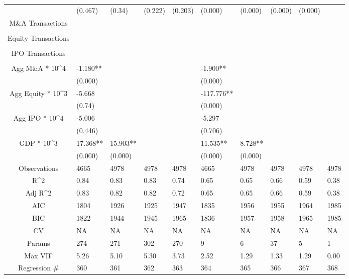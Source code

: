 \documentclass{article}
\begin{document}
\begin{table}[H]
\begin{tabular}{|clllllllll|}
   & (0.467) & (0.34) & (0.222) & (0.203) & (0.000) & (0.000) & (0.000) & (0.000) &  \\ 
  M\&A Transactions &  &  &  &  &  &  &  &  &  \\ 
   &  &  &  &  &  &  &  &  &  \\ 
  Equity Transactions &  &  &  &  &  &  &  &  &  \\ 
   &  &  &  &  &  &  &  &  &  \\ 
  IPO Transactions &  &  &  &  &  &  &  &  &  \\ 
   &  &  &  &  &  &  &  &  &  \\ 
  Agg M\&A * 10^4 & -1.180** &  &  &  & -1.900** &  &  &  &  \\ 
   & (0.000) &  &  &  & (0.000) &  &  &  &  \\ 
  Agg Equity * 10^3 & -5.668 &  &  &  & -117.776** &  &  &  &  \\ 
   & (0.74) &  &  &  & (0.000) &  &  &  &  \\ 
  Agg IPO * 10^4 & -5.006 &  &  &  & -5.297 &  &  &  &  \\ 
   & (0.446) &  &  &  & (0.706) &  &  &  &  \\ 
  GDP * 10^3 & 17.368** & 15.903** &  &  & 11.535** & 8.728** &  &  &  \\ 
   & (0.000) & (0.000) &  &  & (0.000) & (0.000) &  &  &  \\ 
  \hline 
 Observations & 4665 & 4978 & 4978 & 4978 & 4665 & 4978 & 4978 & 4978 & 4978 \\ 
  R^2 & 0.84 & 0.83 & 0.83 & 0.74 & 0.65 & 0.65 & 0.66 & 0.59 & 0.38 \\ 
  Adj R^2 & 0.83 & 0.82 & 0.82 & 0.72 & 0.65 & 0.65 & 0.66 & 0.59 & 0.38 \\ 
  AIC & 1804 & 1926 & 1925 & 1947 & 1835 & 1956 & 1955 & 1964 & 1985 \\ 
  BIC & 1822 & 1944 & 1945 & 1965 & 1836 & 1957 & 1958 & 1965 & 1985 \\ 
  CV & NA & NA & NA & NA & NA & NA & NA & NA & NA \\ 
  Params & 274 & 271 & 302 & 270 & 9 & 6 & 37 & 5 & 1 \\ 
  Max VIF & 5.26 & 5.10 & 5.30 & 3.73 & 2.52 & 1.29 & 1.33 & 1.29 & 0.00 \\ 
  Regression \# & 360 & 361 & 362 & 363 & 364 & 365 & 366 & 367 & 368 \\ 
   \hline
\end{tabular}
 
\end{table}
\end{document}
